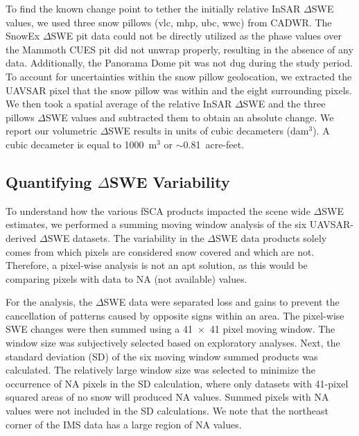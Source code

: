 To find the known change point to tether the initially relative InSAR $\Delta$SWE values, we used three snow pillows (vlc, mhp, ubc, wwc) from CADWR. The SnowEx $\Delta$SWE pit data could not be directly utilized as the phase values over the Mammoth CUES pit did not unwrap properly, resulting in the absence of any data. Additionally, the Panorama Dome pit was not dug during the study period. To account for uncertainties within the snow pillow geolocation, we extracted the UAVSAR pixel that the snow pillow was within and the eight surrounding pixels. We then took a spatial average of the relative InSAR $\Delta$SWE and the three pillows $\Delta$SWE values and subtracted them to obtain an absolute change. We report our volumetric $\Delta$SWE results in units of cubic decameters (dam$^{3}$). A cubic decameter is equal to 1000~m$^{3}$ or $\sim$0.81~acre-feet.

\hypertarget{ch4-methods-2}{\subsection{Quantifying $\Delta$SWE Variability}\label{ch4-methods-1}}

To understand how the various fSCA products impacted the scene wide $\Delta$SWE estimates, we performed a summing moving window analysis of the six UAVSAR-derived $\Delta$SWE datasets. The variability in the $\Delta$SWE data products solely comes from which pixels are considered snow covered and which are not. Therefore, a pixel-wise analysis is not an apt solution, as this would be comparing pixels with data to  NA (not available) values.

For the analysis, the $\Delta$SWE data were separated loss and gains to prevent the cancellation of patterns caused by opposite signs within an area. The pixel-wise SWE changes were then summed using a 41~$\times$~41 pixel moving window. The window size was subjectively selected based on exploratory analyses. Next, the standard deviation (SD) of the six moving window summed products was calculated. The relatively large window size was selected to minimize the occurrence of NA pixels in the SD calculation, where only datasets with 41-pixel squared areas of no snow will produced NA values. Summed pixels with NA values were not included in the SD calculations. We note that the northeast corner of the IMS data has a large region of NA values.

